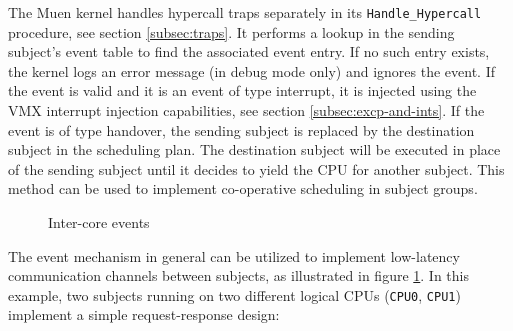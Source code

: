The Muen kernel handles hypercall traps separately in its
\texttt{Handle\_Hypercall} procedure, see section \ref{subsec:traps}. It
performs a lookup in the sending subject's event table to find the associated
event entry. If no such entry exists, the kernel logs an error message (in debug
mode only) and ignores the event. If the event is valid and it is an event of
type interrupt, it is injected using the VMX interrupt injection capabilities,
see section \ref{subsec:excp-and-ints}. If the event is of type handover, the
sending subject is replaced by the destination subject in the scheduling plan.
The destination subject will be executed in place of the sending subject until
it decides to yield the CPU for another subject. This method can be used to
implement co-operative scheduling in subject groups.

\begin{figure}[h]
	\centering
	
	\caption{Inter-core events}
	\label{fig:inter-core-events}
\end{figure}

The event mechanism in general can be utilized to implement low-latency
communication channels between subjects, as illustrated in figure
\ref{fig:inter-core-events}. In this example, two subjects running on two
different logical CPUs (\texttt{CPU0}, \texttt{CPU1}) implement a simple
request-response design:

